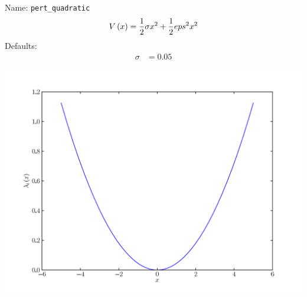 \documentclass[a4paper,10pt]{report}
\begin{document}
\begin{minipage}{0.5\linewidth}
  Name:    \texttt{pert\_quadratic}
  \begin{equation*}
    V\left( x \right) = \frac{1}{2} \sigma x^{2} + \frac{1}{2} eps^{2} x^{2}
  \end{equation*}
  Defaults:
  \begin{align*}
    \sigma & = 0.05
  \end{align*}
\end{minipage}
\begin{minipage}{0.5\linewidth}
  \begin{center}
    \includegraphics[scale=0.25]{./fig/pert_quadratic.pdf}
  \end{center}
\end{minipage}
\end{document}
